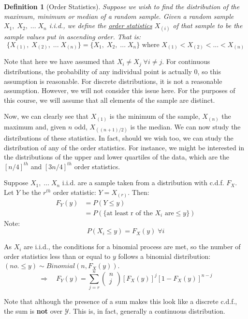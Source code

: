 \documentclass[12pt,a4paper]{article}
\newtheorem{defn}[thm]{Definition}
\begin{document}
\begin{defn}[Order Statistics]\vspace{1cm}

Suppose we wish to find the distribution of the maximum, minimum or median of a random sample. Given a random sample $X_1,\; X_2,\; ...\; X_n$ i.i.d., we define the \underline{order statistics} $X_{(i)}$ of that sample to be the sample values put in ascending order. That is:
$$\{X_{(1)},\; X_{(2)},\; ...\; X_{(n)}\} = \{X_1,\; X_2,\; ...\; X_n\} \text{ where } X_{(1)}<X_{(2)}< ... < X_{(n)}$$
\end{defn}

Note that here we have assumed that $X_i \neq X_j \; \forall i \neq j$. For continuous distributions, the probability of any individual point is actually 0, so this assumption is reasonable. For discrete distributions, it is not a reasonable assumption. However, we will not consider this issue here. For the purposes of this course, we will assume that all elements of the sample are distinct.

Now, we can clearly see that $X_{(1)}$ is the minimum of the sample, $X_{(n)}$ the maximum and, given $n$ odd, $X_{((n+1)/2)}$ is the median. We can now study the distributions of these statistics. In fact, should we wish too, we can study the distribution of any of the order statistics. For instance, we might be interested in the distributions of the upper and lower quartiles of the data, which are the $[n/4]^{th}$ and $[3n/4]^{th}$ order statistics.

Suppose $X_1,\; ...\; X_n$ i.i.d. are a sample taken from a distribution with c.d.f. $F_X$. Let $Y$ be the $r^{th}$ order statistic: $Y=X_{(r)}$. Then:
\begin{align*}
F_Y(y) &= P(Y\leq y)\\
&= P(\{\text{at least r of the $X_i$ are} \leq y\})
\end{align*}
Note:
$$P(X_i \leq y) = F_X(y)\; \forall i$$

As $X_i$ are i.i.d., the conditions for a binomial process are met, so the number of order statistics less than or equal to $y$ follows a binomial distribution: $(no. \leq y) \sim Binomial(n, F_X(y))$.
$$\Rightarrow \quad F_Y(y) = \sum_{j=r}^n \left(\!\!\!\begin{array}{c} n\\j\end{array}\!\!\!\right) [F_X(y)]^j [1-F_X(y)]^{n-j}$$

Note that although the presence of a sum makes this look like a discrete c.d.f., the sum is \textbf{not} over $\mathcal{Y}$. This is, in fact, generally a continuous distribution.
\end{document}
